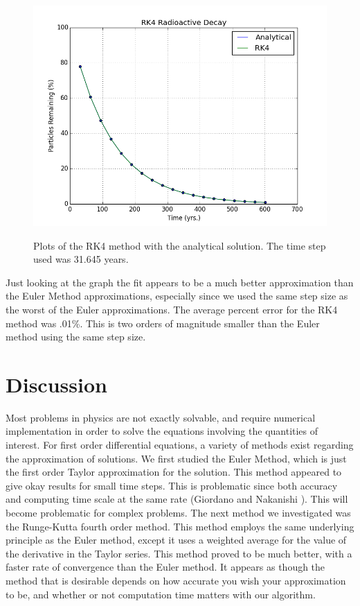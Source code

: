 \documentclass{article}
\begin{document}
\begin{figure}[H]
	\begin{center}
		\includegraphics[scale=.5]{RK4.png}
		\label{RK4Plot}
		\caption{Plots of the RK4 method with the analytical solution. The time step used was 31.645 years.}
	\end{center}
\end{figure}
Just looking at the graph the fit appears to be a much better approximation than the Euler Method approximations, especially since we used the same step size as the worst of the Euler approximations. The average percent error for the RK4 method was .01\%. This is two orders of magnitude smaller than the Euler method using the same step size.

\section{Discussion}
Most problems in physics are not exactly solvable, and require numerical implementation in order to solve the equations involving the quantities of interest. For first order differential equations, a variety of methods exist regarding the approximation of solutions. We first studied the Euler Method, which is just the first order Taylor approximation for the solution. This method appeared to give okay results for small time steps. This is problematic since both accuracy and computing time scale at the same rate (Giordano and Nakanishi \cite{GiordanoNakanishi}). This will become problematic for complex problems. The next method we investigated was the Runge-Kutta fourth order method. This method employs the same underlying principle as the Euler method, except it uses a weighted average for the value of the derivative in the Taylor series. This method proved to be much better, with a faster rate of convergence than the Euler method. It appears as though the method that is desirable depends on how accurate you wish your approximation to be, and whether or not computation time matters with our algorithm.
\end{document}

